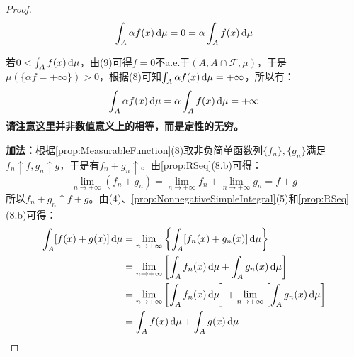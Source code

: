 \begin{proof}
	\begin{equation*}
		\int_{A}\alpha f(x)\mathop{}\!\mathrm{d}\mu=0=\alpha\int_{A}f(x)\mathop{}\!\mathrm{d}\mu
	\end{equation*}\par
	若$0<\int_{A}f(x)\mathop{}\!\mathrm{d}\mu$，由(9)可得$f=0$不a.e.于$(A,A\cap\mathscr{F},\mu)$，于是$\mu(\{\alpha f=+\infty\})>0$，根据(8)可知$\int_{A}\alpha f(x)\mathop{}\!\mathrm{d}\mu=+\infty$，所以有：
	\begin{equation*}
		\int_{A}\alpha f(x)\mathop{}\!\mathrm{d}\mu=\alpha\int_{A}f(x)\mathop{}\!\mathrm{d}\mu=+\infty
	\end{equation*}
	\textbf{请注意这里并非数值意义上的相等，而是定性的无穷。}\par
	\textbf{加法：}根据\cref{prop:MeasurableFunction}(8)取非负简单函数列$\{f_n\},\{g_n\}$满足$f_n\uparrow f,g_n\uparrow g$，于是有$f_n+g_n\uparrow$。由\cref{prop:RSeq}(8.b)可得：
	\begin{equation*}
		\lim_{n\to+\infty}(f_n+g_n)=\lim_{n\to+\infty}f_n+\lim_{n\to+\infty}g_n=f+g
	\end{equation*}
	所以$f_n+g_n\uparrow f+g$。由(4)、\cref{prop:NonnegativeSimpleIntegral}(5)和\cref{prop:RSeq}(8.b)可得：
	\begin{align*}
		\int_{A}[f(x)+g(x)]\dif\mu
		&=\lim_{n\to+\infty}\left\{\int_{A}[f_n(x)+g_n(x)]\dif\mu\right\} \\
		&=\lim_{n\to+\infty}\left[\int_{A}f_n(x)\dif\mu+\int_{A}g_n(x)\dif\mu\right] \\
		&=\lim_{n\to+\infty}\left[\int_{A}f_n(x)\dif\mu\right]+\lim_{n\to+\infty}\left[\int_{A}g_n(x)\dif\mu\right] \\
		&=\int_{A}f(x)\dif\mu+\int_{A}g(x)\dif\mu\qedhere
	\end{align*}
\end{proof}

